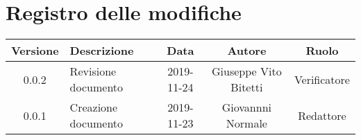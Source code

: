 \section*{Registro delle modifiche}

\begin{center}
	\begin{longtable}{|c|p{5cm}|c|c|c|}
	\hline
	\rowcolor{lighter-grayer}
	\textbf{Versione} & \textbf{Descrizione} & \textbf{Data} & \textbf{Autore} & \textbf{Ruolo} \\
	\hline
	\endfirsthead


	0.0.2 & Revisione documento & 2019-11-24 & Giuseppe Vito Bitetti & Verificatore \\
	\hline
	0.0.1 & Creazione documento & 2019-11-23 & Giovannni Normale & Redattore \\
	\hline

	\end{longtable}
\end{center}